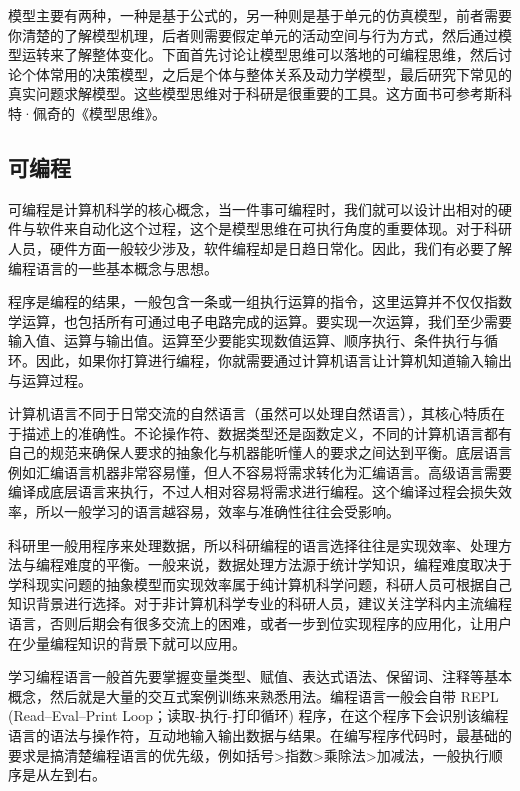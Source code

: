 \documentclass[]{tufte-book}
\begin{document}
模型主要有两种，一种是基于公式的，另一种则是基于单元的仿真模型，前者需要你清楚的了解模型机理，后者则需要假定单元的活动空间与行为方式，然后通过模型运转来了解整体变化。下面首先讨论让模型思维可以落地的可编程思维，然后讨论个体常用的决策模型，之后是个体与整体关系及动力学模型，最后研究下常见的真实问题求解模型。这些模型思维对于科研是很重要的工具。这方面书可参考斯科特·佩奇的《模型思维》。

\hypertarget{ux53efux7f16ux7a0b}{%
\subsection{可编程}\label{ux53efux7f16ux7a0b}}

可编程是计算机科学的核心概念，当一件事可编程时，我们就可以设计出相对的硬件与软件来自动化这个过程，这个是模型思维在可执行角度的重要体现。对于科研人员，硬件方面一般较少涉及，软件编程却是日趋日常化。因此，我们有必要了解编程语言的一些基本概念与思想。

程序是编程的结果，一般包含一条或一组执行运算的指令，这里运算并不仅仅指数学运算，也包括所有可通过电子电路完成的运算。要实现一次运算，我们至少需要输入值、运算与输出值。运算至少要能实现数值运算、顺序执行、条件执行与循环。因此，如果你打算进行编程，你就需要通过计算机语言让计算机知道输入输出与运算过程。

计算机语言不同于日常交流的自然语言（虽然可以处理自然语言），其核心特质在于描述上的准确性。不论操作符、数据类型还是函数定义，不同的计算机语言都有自己的规范来确保人要求的抽象化与机器能听懂人的要求之间达到平衡。底层语言例如汇编语言机器非常容易懂，但人不容易将需求转化为汇编语言。高级语言需要编译成底层语言来执行，不过人相对容易将需求进行编程。这个编译过程会损失效率，所以一般学习的语言越容易，效率与准确性往往会受影响。

科研里一般用程序来处理数据，所以科研编程的语言选择往往是实现效率、处理方法与编程难度的平衡。一般来说，数据处理方法源于统计学知识，编程难度取决于学科现实问题的抽象模型而实现效率属于纯计算机科学问题，科研人员可根据自己知识背景进行选择。对于非计算机科学专业的科研人员，建议关注学科内主流编程语言，否则后期会有很多交流上的困难，或者一步到位实现程序的应用化，让用户在少量编程知识的背景下就可以应用。

学习编程语言一般首先要掌握变量类型、赋值、表达式语法、保留词、注释等基本概念，然后就是大量的交互式案例训练来熟悉用法。编程语言一般会自带 REPL (Read--Eval--Print Loop；读取-执行-打印循环) 程序，在这个程序下会识别该编程语言的语法与操作符，互动地输入输出数据与结果。在编写程序代码时，最基础的要求是搞清楚编程语言的优先级，例如括号\textgreater 指数\textgreater 乘除法\textgreater 加减法，一般执行顺序是从左到右。
\end{document}
